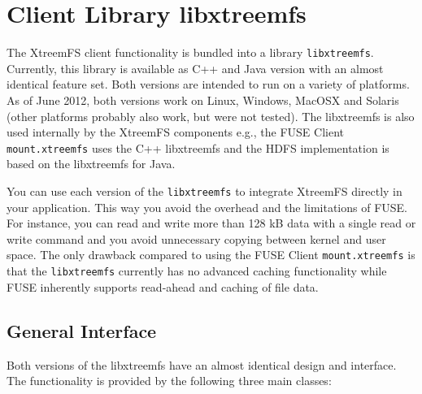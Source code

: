 \documentclass[a4paper,10pt]{book}
\begin{document}
\chapter{Client Library libxtreemfs}
\label{sec:libxtreemfs}

The XtreemFS client functionality is bundled into a library \texttt{libxtreemfs}. Currently, this library is available as C++ and Java version with an almost identical feature set. Both versions are intended to run on a variety of platforms. As of June 2012, both versions work on Linux, Windows, MacOSX and Solaris (other platforms probably also work, but were not tested). The libxtreemfs is also used internally by the XtreemFS components e.g., the FUSE Client \texttt{mount.xtreemfs} uses the C++ libxtreemfs and the HDFS implementation is based on the libxtreemfs for Java.

You can use each version of the \texttt{libxtreemfs} to integrate XtreemFS directly in your application. This way you avoid the overhead and the limitations of FUSE. For instance, you can read and write more than 128 kB data with a single read or write command and you avoid unnecessary copying between kernel and user space. The only drawback compared to using the FUSE Client \texttt{mount.xtreemfs} is that the \texttt{libxtreemfs} currently has no advanced caching functionality while FUSE inherently supports read-ahead and caching of file data.

\section{General Interface}

Both versions of the libxtreemfs have an almost identical design and interface. The functionality is provided by the following three main classes:
\end{document}

